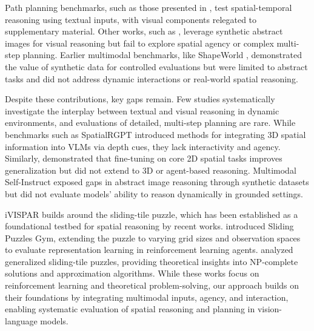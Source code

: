 Path planning benchmarks, such as those presented in \citet{DBLP:journals/corr/abs-2310-03249}, test spatial-temporal reasoning using textual inputs, with visual components relegated to supplementary material. Other works, such as \citet{DBLP:conf/emnlp/ZhangCHW0THHM0Z24}, leverage synthetic abstract images for visual reasoning but fail to explore spatial agency or complex multi-step planning. Earlier multimodal benchmarks, like ShapeWorld \cite{DBLP:journals/corr/KuhnleC17}, demonstrated the value of synthetic data for controlled evaluations but were limited to abstract tasks and did not address dynamic interactions or real-world spatial reasoning.

Despite these contributions, key gaps remain. Few studies systematically investigate the interplay between textual and visual reasoning in dynamic environments, and evaluations of detailed, multi-step planning are rare. While benchmarks such as SpatialRGPT \cite{DBLP:journals/corr/abs-2406-13246} introduced methods for integrating 3D spatial information into VLMs via depth cues, they lack interactivity and agency. Similarly, \citet{DBLP:journals/corr/abs-2410-16162} demonstrated that fine-tuning on core 2D spatial tasks improves generalization but did not extend to 3D or agent-based reasoning. Multimodal Self-Instruct \cite{DBLP:conf/emnlp/ZhangCHW0THHM0Z24} exposed gaps in abstract image reasoning through synthetic datasets but did not evaluate models' ability to reason dynamically in grounded settings.

iVISPAR builds around the sliding-tile puzzle, which has been established as a foundational testbed for spatial reasoning by recent works. \citet{DBLP:journals/corr/abs-2410-14038} introduced Sliding Puzzles Gym, extending the puzzle to varying grid sizes and observation spaces to evaluate representation learning in reinforcement learning agents. \citet{DBLP:conf/aaai/GozonY24} analyzed generalized sliding-tile puzzles, providing theoretical insights into NP-complete solutions and approximation algorithms. While these works focus on reinforcement learning and theoretical problem-solving, our approach builds on their foundations by integrating multimodal inputs, agency, and interaction, enabling systematic evaluation of spatial reasoning and planning in vision-language models.